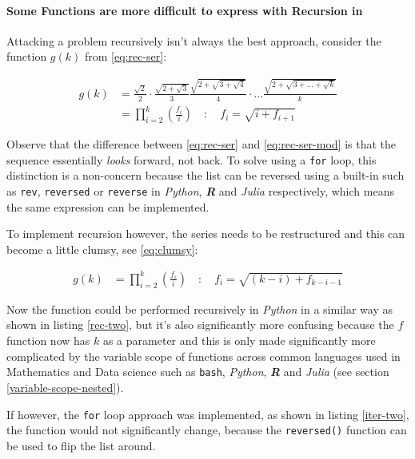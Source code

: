 \documentclass[11pt]{article}
\begin{document}
\paragraph{Some Functions are more difficult to express with Recursion in}
\label{some-functions-are-more-difficult-to-express-with-recursion-in-python}
Attacking a problem recursively isn't always the best approach, consider the function \(g\left( k \right)\) from \eqref{eq:rec-ser}:


\begin{align}
    g\left( k \right) &=  \frac{\sqrt{2} }{2} \cdot   \frac{\sqrt{2+  \sqrt{3}}  }{3} \frac{\sqrt{2 +  \sqrt{3 +  \sqrt{4} } } }{4} \cdot  \ldots \frac{\sqrt{2 +  \sqrt{3 +  \ldots +  \sqrt{k} } } }{k} \nonumber \\
    &=  \prod^k_{i = 2} \left( \frac{f_i}{i}  \right) \quad : \quad f_{i} = \sqrt{i +  f_{i+1}} \nonumber
\end{align}

Observe that the difference between \eqref{eq:rec-ser} and \eqref{eq:rec-ser-mod} is
that the sequence essentially \emph{looks} forward, not back. To solve using a \texttt{for}
loop, this distinction is a non-concern because the list can be reversed using a built-in
such as \texttt{rev}, \texttt{reversed} or \texttt{reverse} in \emph{Python}, \textbf{\emph{R}} and \emph{Julia}
respectively, which means the same expression can be implemented.

To implement recursion however, the series needs to be restructured and this can become a little clumsy, see \eqref{eq:clumsy}:

\begin{align}
    g\left( k \right) &=  \prod^k_{i = 2} \left( \frac{f_i}{i}  \right) \quad : \quad f_{i} = \sqrt{\left( k- i \right)  +  f_{k - i - 1}} \label{eq:clumsy}
\end{align}

Now the function could be performed recursively in \emph{Python} in a similar
way as shown in listing \ref{rec-two}, but it's also significantly more confusing because the \(f\) function now has \(k\) as a parameter and this is only made significantly more complicated by the variable scope of functions across common languages used in Mathematics and Data science such as \texttt{bash}, \emph{Python}, \textbf{\emph{R}} and \emph{Julia} (see section \ref{variable-scope-nested}).


If however, the \texttt{for} loop approach was implemented, as shown in listing
\ref{iter-two}, the function would not significantly change, because the \texttt{reversed()} function can be
used to flip the list around.
\end{document}

